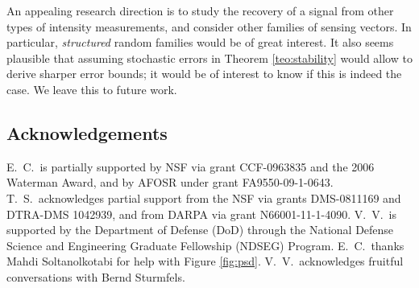 \documentclass[11pt]{article}
\newcommand{\<}{\langle}
\renewcommand{\>}{\rangle}
\numberwithin{equation}{section}
\begin{document}
An appealing research direction is to study the recovery of a signal
from other types of intensity measurements, and consider other
families of sensing vectors. In particular, {\em structured} random
families would be of great interest.  It also seems plausible that
assuming stochastic errors in Theorem \ref{teo:stability} would allow
to derive sharper error bounds; it would be of interest to know if
this is indeed the case. We leave this to future work.


\begin{small}
\subsection*{Acknowledgements}

E.~C.~is partially supported by NSF via grant CCF-0963835 and the 2006
Waterman Award, and by AFOSR under grant FA9550-09-1-0643.  T.~S.\
acknowledges partial support from the NSF via grants DMS-0811169 and
DTRA-DMS 1042939, and from DARPA via grant N66001-11-1-4090. 
V.~V.~is supported by the
Department of Defense (DoD) through the National Defense Science and
Engineering Graduate Fellowship (NDSEG) Program. E.~C.~thanks Mahdi
Soltanolkotabi for help with Figure \ref{fig:psd}.  V.~V.~acknowledges
fruitful conversations with Bernd Sturmfels.

\end{small}

\begin{small}


\end{small}
\end{document}
